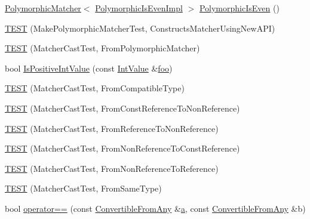 \begin{DoxyCompactItemize}
\item 
\hyperlink{classtesting_1_1_polymorphic_matcher}{Polymorphic\+Matcher}$<$ \hyperlink{classtesting_1_1gmock__matchers__test_1_1_polymorphic_is_even_impl}{Polymorphic\+Is\+Even\+Impl} $>$ \hyperlink{namespacetesting_1_1gmock__matchers__test_a8a0035a0de2d219d89ff7070762ece72}{Polymorphic\+Is\+Even} ()
\item 
\hyperlink{namespacetesting_1_1gmock__matchers__test_a619d872aa86419c5093327f64c466df3}{T\+E\+ST} (Make\+Polymorphic\+Matcher\+Test, Constructs\+Matcher\+Using\+New\+A\+PI)
\item 
\hyperlink{namespacetesting_1_1gmock__matchers__test_afffaa6f2c436edb7c46e7a16ed2de825}{T\+E\+ST} (Matcher\+Cast\+Test, From\+Polymorphic\+Matcher)
\item 
bool \hyperlink{namespacetesting_1_1gmock__matchers__test_a68565741c989968637db5a9e10e55020}{Is\+Positive\+Int\+Value} (const \hyperlink{classtesting_1_1gmock__matchers__test_1_1_int_value}{Int\+Value} \&\hyperlink{namespacetesting_1_1gmock__matchers__test_a3536e68112ffbb1f76887cd15bb45c15}{foo})
\item 
\hyperlink{namespacetesting_1_1gmock__matchers__test_aa7a28536a6c59d56bbbbdb4fa5ba9e4d}{T\+E\+ST} (Matcher\+Cast\+Test, From\+Compatible\+Type)
\item 
\hyperlink{namespacetesting_1_1gmock__matchers__test_a9d25aac0defd9296bf207cacd342aff0}{T\+E\+ST} (Matcher\+Cast\+Test, From\+Const\+Reference\+To\+Non\+Reference)
\item 
\hyperlink{namespacetesting_1_1gmock__matchers__test_a4bb3955a1e0b603c0156c98a2dc49eea}{T\+E\+ST} (Matcher\+Cast\+Test, From\+Reference\+To\+Non\+Reference)
\item 
\hyperlink{namespacetesting_1_1gmock__matchers__test_a6fd48b8275f96d9d4ee840f0ec590fb1}{T\+E\+ST} (Matcher\+Cast\+Test, From\+Non\+Reference\+To\+Const\+Reference)
\item 
\hyperlink{namespacetesting_1_1gmock__matchers__test_ab8d3174b8f1ab799906938ed9984643b}{T\+E\+ST} (Matcher\+Cast\+Test, From\+Non\+Reference\+To\+Reference)
\item 
\hyperlink{namespacetesting_1_1gmock__matchers__test_a8f845dd5b1bcdc660926d67dce32b5d2}{T\+E\+ST} (Matcher\+Cast\+Test, From\+Same\+Type)
\item 
bool \hyperlink{namespacetesting_1_1gmock__matchers__test_af0b7ba716a9150ff6db37abda4b44fc8}{operator==} (const \hyperlink{structtesting_1_1gmock__matchers__test_1_1_convertible_from_any}{Convertible\+From\+Any} \&\hyperlink{_07copy_08_2_read_camera_model_8m_a551a3d351eadcc0b9b1a2f24f0fb5ea0}{a}, const \hyperlink{structtesting_1_1gmock__matchers__test_1_1_convertible_from_any}{Convertible\+From\+Any} \&b)

\end{DoxyCompactItemize}
